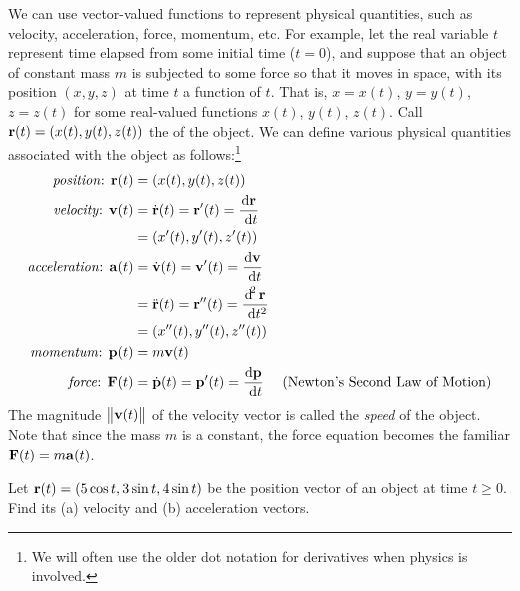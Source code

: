 We can use vector-valued functions to represent physical quantities, such as 
velocity, acceleration, force, momentum,
etc. For example, let the real variable $t$ represent time elapsed from some 
initial time ($t = 0$), and suppose
that an object of constant mass $m$ is subjected to some force so that it moves 
in space, with its position $(x,y,z)$ at
time $t$ a function of $t$. That is, $x = x(t)$, $y = y(t)$, $z = z(t)$ for 
some real-valued functions $x(t)$, $y(t)$,
$z(t)$. Call $\mathbf{ r}(t) = (x(t),y(t),z(t))$ the  of the object. We
can define various physical quantities associated with the object as 
follows:\footnote{We will often use the
older dot notation for derivatives when physics is involved.}
\begin{align*}
 \text{\emph{position}: } \vector{r}(t) &= (x(t),y(t),z(t))\\
 \text{\emph{velocity}: } \vector{v}(t) &= \dot{\vector{r}}(t) = 
\vector{r}'(t) = \dfrac{\d \vector{r}}{\dt}\\
 &= (x'(t),y'(t),z'(t))\\
 \text{\emph{acceleration}: } \vector{a}(t) &= \dot{\vector{v}}(t) = 
\vector{v}'(t) = \dfrac{\d \vector{v}}{\dt}\\
 &= \ddot{\vector{r}}(t) = \vector{r}''(t) = \dfrac{\d^2 \vector{r}}{\dt^2}\\
 &= (x''(t),y''(t),z''(t))\\
 \text{\emph{momentum}: } \vector{p}(t) &= m \vector{v}(t)\\
 \text{\emph{force}: } \vector{F}(t) &= \dot{\vector{p}}(t) = \vector{p}'(t) 
= \dfrac{\d \vector{p}}{\dt}
 \text{~~~~(Newton's Second Law of Motion)}
\end{align*}
The magnitude ${\left\|\mathbf{ v}(t)\right\|}$ of the velocity vector is called the 
\emph{speed} of the object.
Note that since the mass $m$ is a constant, the force equation becomes the 
familiar
$\mathbf{ F}(t) = m 
\mathbf{ a}(t)$.

\vspace{2mm}
\begin{exa}
 Let $\mathbf{ r}(t) = (5 \cos t , 3 \sin t , 4 \sin t )$ be the position vector 
of an object at time $t \ge 0$. Find
 its (a) velocity and (b) acceleration vectors.\vspace{1mm}
\end{exa}

